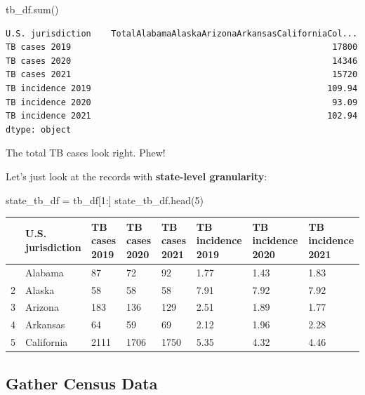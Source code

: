 \documentclass[
  letterpaper,
  DIV=11,
  numbers=noendperiod]{scrreprt}
\newenvironment{Shaded}{\begin{snugshade}}{\end{snugshade}}
\newcommand{\BuiltInTok}[1]{\textcolor[rgb]{0.00,0.23,0.31}{#1}}
\newcommand{\DecValTok}[1]{\textcolor[rgb]{0.68,0.00,0.00}{#1}}
\newcommand{\NormalTok}[1]{\textcolor[rgb]{0.00,0.23,0.31}{#1}}
\newcommand{\OperatorTok}[1]{\textcolor[rgb]{0.37,0.37,0.37}{#1}}
\begin{document}
\begin{Shaded}
\begin{Highlighting}[]
\NormalTok{tb\_df.}\BuiltInTok{sum}\NormalTok{()}
\end{Highlighting}
\end{Shaded}

\begin{verbatim}
U.S. jurisdiction    TotalAlabamaAlaskaArizonaArkansasCaliforniaCol...
TB cases 2019                                                    17800
TB cases 2020                                                    14346
TB cases 2021                                                    15720
TB incidence 2019                                               109.94
TB incidence 2020                                                93.09
TB incidence 2021                                               102.94
dtype: object
\end{verbatim}

The total TB cases look right. Phew!

Let's just look at the records with \textbf{state-level granularity}:

\begin{Shaded}
\begin{Highlighting}[]
\NormalTok{state\_tb\_df }\OperatorTok{=}\NormalTok{ tb\_df[}\DecValTok{1}\NormalTok{:]}
\NormalTok{state\_tb\_df.head(}\DecValTok{5}\NormalTok{)}
\end{Highlighting}
\end{Shaded}

\begin{longtable}[]{@{}llllllll@{}}
\toprule\noalign{}
& U.S. jurisdiction & TB cases 2019 & TB cases 2020 & TB cases 2021 & TB
incidence 2019 & TB incidence 2020 & TB incidence 2021 \\
\midrule\noalign{}
\endhead
\bottomrule\noalign{}
\endlastfoot
1 & Alabama & 87 & 72 & 92 & 1.77 & 1.43 & 1.83 \\
2 & Alaska & 58 & 58 & 58 & 7.91 & 7.92 & 7.92 \\
3 & Arizona & 183 & 136 & 129 & 2.51 & 1.89 & 1.77 \\
4 & Arkansas & 64 & 59 & 69 & 2.12 & 1.96 & 2.28 \\
5 & California & 2111 & 1706 & 1750 & 5.35 & 4.32 & 4.46 \\
\end{longtable}

\subsection{Gather Census Data}\label{gather-census-data}
\end{document}
